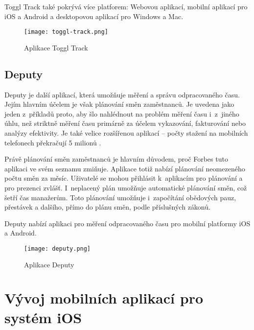 Toggl Track také pokrývá více platforem: Webovou aplikací, mobilní aplikací pro iOS a Android a desktopovou aplikací pro Windows a Mac. \cite{toggl-track}

\begin{figure}[h]
	\centering
	\texttt{[image: toggl-track.png]}
	\caption{Aplikace Toggl Track \cite{toggl-track}}
\end{figure}

\subsection{Deputy}

Deputy je další aplikací, která umožňuje měření a správu odpracovaného času. Jejím hlavním účelem je však plánování směn zaměstnanců. Je uvedena jako jeden z~příkladů proto, aby šlo nahlédnout na problém měření času i~z~jiného úhlu, než striktně měření času primárně za účelem vykazování, fakturování nebo analýzy efektivity. Je také velice rozšířenou aplikací – počty stažení na mobilních telefonech překračují 5 milionů \cite{deputy-app-magic}.

Právě plánování směn zaměstnanců je hlavním důvodem, proč Forbes tuto aplikaci ve svém seznamu zmiňuje. Aplikace totiž nabízí plánování neomezeného počtu směn za měsíc. Uživatelé se mohou přihlásit k~aplikacím pro plánování a pro prezenci zvlášť. I~neplacený plán umožňuje automatické plánování směn, což šetří čas manažerům. Toto plánování umožňuje i~započítání obědových pauz, přestávek a dalšího, přímo do plánu směn, podle příslušných zákonů.  \cite{forbes-tracking-apps-article}

Deputy nabízí aplikaci pro měření odpracovaného času pro mobilní platformy iOS a Android. 

\begin{figure}[h]
	\centering
	\texttt{[image: deputy.png]}
	\caption{Aplikace Deputy \cite{deputy-time-tracking-app}}
\end{figure}

\section{Vývoj mobilních aplikací pro systém iOS}

